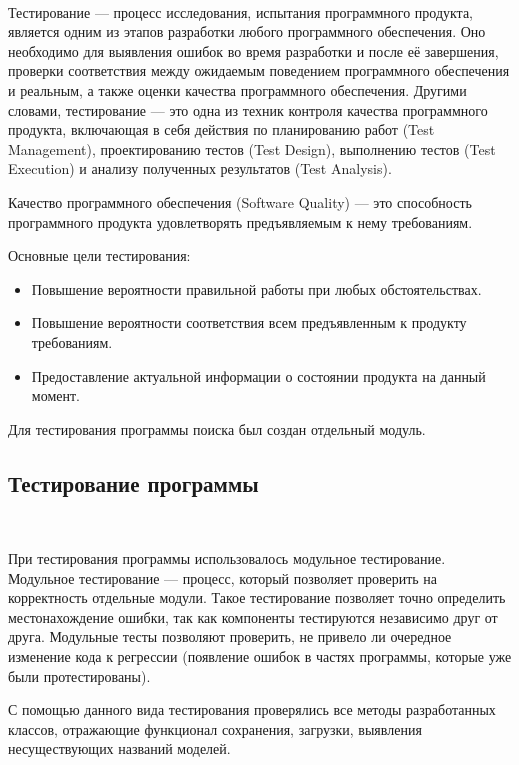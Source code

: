 
\

Тестирование — процесс исследования, испытания программного продукта, является одним из этапов разработки любого программного обеспечения. Оно необходимо для выявления ошибок во время разработки и после её завершения, проверки соответствия между ожидаемым поведением программного обеспечения и реальным, а также оценки качества программного обеспечения. Другими словами, тестирование — это одна из техник контроля качества программного продукта, включающая в себя действия по планированию работ (Test Management), проектированию тестов (Test Design), выполнению тестов (Test Execution) и анализу полученных результатов (Test Analysis).

Качество программного обеспечения (Software Quality) — это способность программного продукта удовлетворять предъявляемым к нему требованиям. 

Основные цели тестирования:

\begin{itemize}
	\item Повышение вероятности правильной работы при любых обстоятельствах.
	\item Повышение вероятности соответствия всем предъявленным к продукту требованиям.
	\item Предоставление актуальной информации о состоянии продукта на данный момент.
\end{itemize}

Для тестирования программы поиска был создан отдельный модуль.

\newpage

\subsection{Тестирование программы}
\

При тестирования программы использовалось модульное тестирование. Модульное тестирование — процесс, который позволяет проверить на корректность отдельные модули. Такое тестирование позволяет точно определить местонахождение ошибки, так как компоненты тестируются независимо друг от друга. Модульные тесты позволяют проверить, не привело ли очередное изменение кода к регрессии (появление ошибок в частях программы, которые уже были протестированы).

С помощью данного вида тестирования проверялись все методы разработанных классов, отражающие функционал сохранения, загрузки, выявления несуществующих названий моделей.

